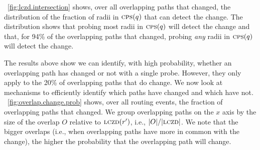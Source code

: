 


\figstr~\ref{fig:lczd.intersection} shows, over all overlapping
paths that changed, the distribution of the fraction of radii in
$\mathrm{\textsc{cps}}(q)$ that can detect the change.  The distribution shows that
probing most radii in $\mathrm{\textsc{cps}}(q)$ will detect the change and
that, for 94\% of the overlapping paths that changed, probing
\emph{any} radii in $\mathrm{\textsc{cps}}(q)$ will detect the change.

 The results above show we
can identify, with high probability, whether an overlapping path has
changed or not with a single probe.  However, they only apply to the
20\% of overlapping paths that do change.  We now look at mechanisms
to efficiently identify which paths have changed and which have not.
\figstr~\ref{fig:overlap.change.prob} shows, over all routing
events, the fraction of overlapping paths that changed.  We group
overlapping paths on the $x$ axis by the size of the overlap $O$
relative to $\mathrm{\textsc{lczd}}(r')$, i.e., $|O|/|\mathrm{\textsc{lczd}}|$.  We note that the
bigger overlaps (i.e., when overlapping paths have more in common
with the change), the higher the probability that the overlapping
path will change.  


